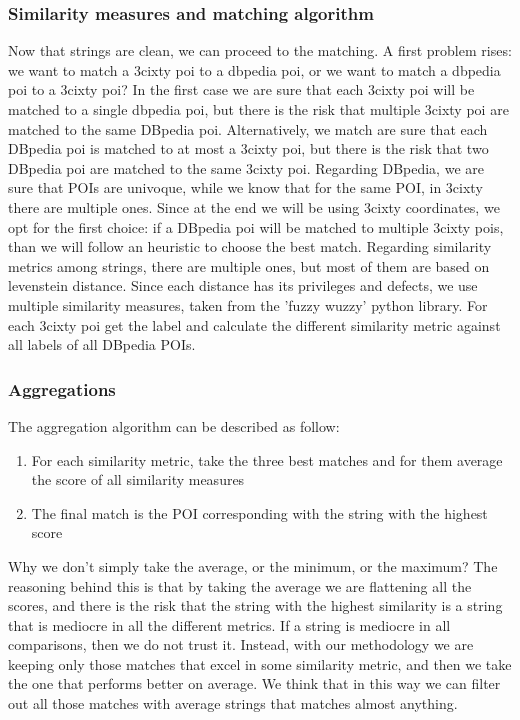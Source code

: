\subsubsection{Similarity measures and matching algorithm}
Now that strings are clean, we can proceed to the matching. A first problem rises: we want to match a 3cixty poi to a dbpedia poi, or we want to match a dbpedia poi to a 3cixty poi? In the first case we are sure that each 3cixty poi will be matched to a single dbpedia poi, but there is the risk that multiple 3cixty poi are matched to the same DBpedia poi. Alternatively, we match are sure that each DBpedia poi is matched to at most a 3cixty poi, but there is the risk that two DBpedia poi are matched to the same 3cixty poi.
Regarding DBpedia, we are sure that POIs are univoque, while we know that for the same POI, in 3cixty there are multiple ones.
Since at the end we will be using 3cixty coordinates, we opt for the first choice: if a DBpedia poi will be matched to multiple 3cixty pois, than we will follow an heuristic to choose the best match.
Regarding similarity metrics among strings, there are multiple ones, but most of them are based on levenstein distance.
Since each distance has its privileges and defects, we use multiple similarity measures, taken from the 'fuzzy wuzzy' python library.
For each 3cixty poi get the label and calculate the different similarity metric against all labels of all DBpedia POIs.



\subsubsection{Aggregations}
The aggregation algorithm can be described as follow:
\begin{enumerate}
\item For each similarity metric, take the three best matches and for them average the score of all similarity measures
\item The final match is the POI corresponding with the string with the highest score
\end{enumerate}
Why we don't simply take the average, or the minimum, or the maximum?
The reasoning behind this is that by taking the average we are flattening all the scores, and there is the risk that the string with the highest similarity is a string that is mediocre in all the different metrics. If a string is mediocre in all comparisons, then we do not trust it. Instead, with our methodology we are keeping only those matches that excel in some similarity metric, and then we take the one that performs better on average. We think that in this way we can filter out all those matches with average strings that matches almost anything.

